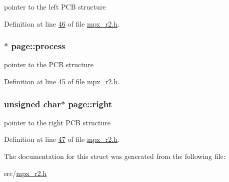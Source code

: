 pointer to the left PCB structure 



Definition at line \hyperlink{mpx__r2_8h_source_l00046}{46} of file \hyperlink{mpx__r2_8h_source}{mpx\_\-r2.h}.

\hypertarget{structpage_af3cc0e1320b79159b230f154f1a95f0d}{
\subsubsection[{process}]{$\ast$ {\bf page::process}}}
\label{structpage_af3cc0e1320b79159b230f154f1a95f0d}


pointer to the PCB structure 



Definition at line \hyperlink{mpx__r2_8h_source_l00045}{45} of file \hyperlink{mpx__r2_8h_source}{mpx\_\-r2.h}.

\hypertarget{structpage_a59bb1b5eca2d579befcc93a2833f4dfd}{
\subsubsection[{right}]{\setlength{\rightskip}{0pt plus 5cm}unsigned char$\ast$ {\bf page::right}}}
\label{structpage_a59bb1b5eca2d579befcc93a2833f4dfd}


pointer to the right PCB structure 



Definition at line \hyperlink{mpx__r2_8h_source_l00047}{47} of file \hyperlink{mpx__r2_8h_source}{mpx\_\-r2.h}.



The documentation for this struct was generated from the following file:\begin{DoxyCompactItemize}
\item 
src/\hyperlink{mpx__r2_8h}{mpx\_\-r2.h}\end{DoxyCompactItemize}
